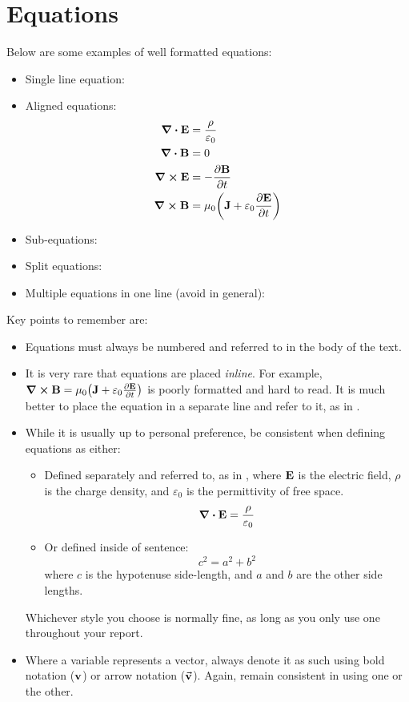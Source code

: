 \section{Equations}
Below are some examples of well formatted equations:
\begin{itemize}
    \item Single line equation: 
    \item Aligned equations:
        \begin{align}
            \div{\vb{E}} &= \frac{\rho}{\varepsilon_0} \\
            \div{\vb{B}} &= 0 \\
            \curl{\vb{E}} &= -\pdv{\vb{B}}{t}\\
            \label{eq:DisplayMath}\curl{\vb{B}} &= \mu_0\qty(\vb{J} + \varepsilon_0 \pdv{\vb{E}}{t})
        \end{align}
    \item Sub-equations: 
    \item Split equations: 
    \item Multiple equations in one line (avoid in general): 
\end{itemize}
Key points to remember are:
\begin{itemize}
    \item Equations must always be numbered and referred to in the body of the text.
    \item It is very rare that equations are placed \textit{inline}. For example, $\curl{\vb{B}} = \mu_0\qty(\vb{J} + \varepsilon_0 \pdv{\vb{E}}{t})$ is poorly formatted and hard to read. It is much better to place the equation in a separate line and refer to it, as in .
    \item While it is usually up to personal preference, be consistent when defining equations as either:
    \begin{itemize}
        \item Defined separately and referred to, as in , where $\vb{E}$ is the electric field, $\rho$ is the charge density, and $\varepsilon_0$ is the permittivity of free space.
        \begin{equation}\label{eq:Refer}
            \div{\vb{E}} = \frac{\rho}{\varepsilon_0}
        \end{equation}
        \item Or defined inside of sentence:
            \begin{equation}
                c^2 = a^2 + b^2
            \end{equation}
        where $c$ is the hypotenuse side-length, and $a$ and $b$ are the other side lengths.
    \end{itemize}
    Whichever style you choose is normally fine, as long as you only use one throughout your report.
    \item Where a variable represents a vector, always denote it as such using bold notation ($\vb{v}$) or arrow notation ($\va{v}$). Again, remain consistent in using one or the other.
\end{itemize}